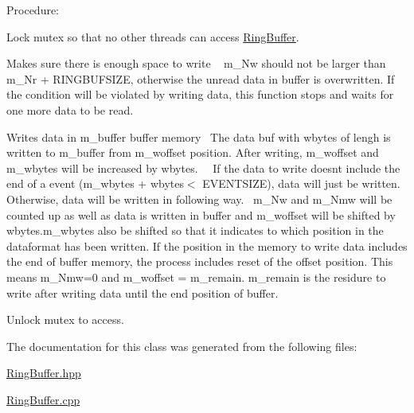 Procedure\+:
\begin{DoxyItemize}
\item Lock mutex so that no other threads can access \hyperlink{class_l_s_t_d_a_q_1_1_ring_buffer}{Ring\+Buffer}.
\item Makes sure there is enough space to write ~\newline
 m\+\_\+\+Nw should not be larger than m\+\_\+\+Nr + R\+I\+N\+G\+B\+U\+F\+S\+I\+Z\+E, otherwise the unread data in buffer is overwritten. If the condition will be violated by writing data, this function stops and waits for one more data to be read.
\item Writes data in m\+\_\+buffer buffer memory~\newline
 The data buf with wbytes of lengh is written to m\+\_\+buffer from m\+\_\+woffset position. After writing, m\+\_\+woffset and m\+\_\+wbytes will be increased by wbytes. 　\+If the data to write doesn\textquotesingle{}t include the end of a event (m\+\_\+wbytes + wbytes$<$ E\+V\+E\+N\+T\+S\+I\+Z\+E), data will just be written. Otherwise, data will be written in following way.~\newline
 m\+\_\+\+Nw and m\+\_\+\+Nmw will be counted up as well as data is written in buffer and m\+\_\+woffset will be shifted by wbytes.\+m\+\_\+wbytes also be shifted so that it indicates to which position in the dataformat has been written. If the position in the memory to write data includes the end of buffer memory, the process includes reset of the offset position. This means m\+\_\+\+Nmw=0 and m\+\_\+woffset = m\+\_\+remain. m\+\_\+remain is the residure to write after writing data until the end position of buffer.
\item Unlock mutex to access. 
\end{DoxyItemize}

The documentation for this class was generated from the following files\+:\begin{DoxyCompactItemize}
\item 
\hyperlink{_ring_buffer_8hpp}{Ring\+Buffer.\+hpp}\item 
\hyperlink{_ring_buffer_8cpp}{Ring\+Buffer.\+cpp}\end{DoxyCompactItemize}
